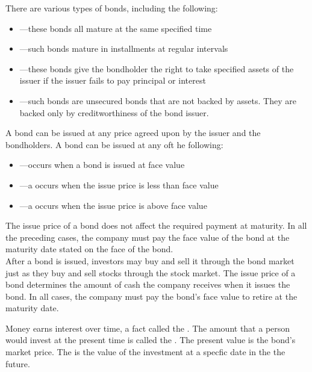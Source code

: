 \documentclass{article}
\begin{document}
There are various types of bonds, including the following: 
\begin{itemize}
  \item {}---these bonds all mature at the same specified time 
  \item {}---such bonds mature in installments at regular intervals 
  \item {}---these bonds give the bondholder the right to take specified assets of the issuer if the issuer fails to pay principal or interest 
  \item {}---such bonds are unsecured bonds that are not backed by assets. They are backed only by creditworthiness of the bond issuer. 
\end{itemize}

A bond can be issued at any price agreed upon by the issuer and the bondholders. A bond can be issued at any oft he following: 
\begin{itemize}
  \item {}---occurs when a bond is issued at face value 
  \item {}---a  occurs when the issue price is less than face value 
  \item {}---a  occurs when the issue price is above face value
\end{itemize}

The issue price of a bond does not affect the required payment at maturity. In all the preceding cases, the company must pay the face value of the bond at the maturity date stated on the face of the bond. \\ 

After a bond is issued, investors may buy and sell it through the bond market just as they buy and sell stocks through the stock market. The issue price of a bond determines the amount of cash the company receives when it issues the bond. In all cases, the company must pay the bond's face value to retire at the maturity date. 

Money earns interest over time, a fact called the . The amount that a person would invest at the present time is called the . The present value is the bond's market price. The  is the value of the investment at a specfic date in the the future. \\ 
\end{document}
